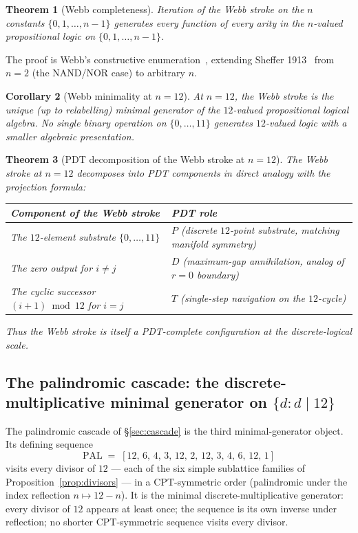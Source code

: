 \documentclass[11pt,a4paper]{article}
\newtheorem{theorem}{Theorem}[section]
\newtheorem{corollary}[theorem]{Corollary}
\theoremstyle{definition}
\theoremstyle{remark}
\begin{document}
\begin{theorem}[Webb completeness]\label{thm:webb-complete}
Iteration of the Webb stroke on the $n$ constants $\{0,1,\ldots,n-1\}$ generates every function of every arity in the $n$-valued propositional logic on $\{0,1,\ldots,n-1\}$.
\end{theorem}

The proof is Webb's constructive enumeration~\cite{Webb1935}, extending Sheffer 1913~\cite{Sheffer1913} from $n=2$ (the NAND/NOR case) to arbitrary $n$.

\begin{corollary}[Webb minimality at $n=12$]\label{cor:webb-minimal}
At $n=12$, the Webb stroke is the unique (up to relabelling) minimal generator of the $12$-valued propositional logical algebra. No single binary operation on $\{0,\ldots,11\}$ generates $12$-valued logic with a smaller algebraic presentation.
\end{corollary}

\begin{theorem}[PDT decomposition of the Webb stroke at $n=12$]\label{thm:webb-pdt}
The Webb stroke at $n=12$ decomposes into PDT components in direct analogy with the projection formula:
\begin{center}
\begin{tabularx}{\textwidth}{@{}XX@{}}
\toprule
Component of the Webb stroke & PDT role\\
\midrule
The $12$-element substrate $\{0,\ldots,11\}$ & $P$ (discrete $12$-point substrate, matching manifold symmetry)\\
The zero output for $i\ne j$ & $D$ (maximum-gap annihilation, analog of $r=0$ boundary)\\
The cyclic successor $(i+1)\bmod 12$ for $i=j$ & $T$ (single-step navigation on the $12$-cycle)\\
\bottomrule
\end{tabularx}
\end{center}
Thus the Webb stroke is itself a PDT-complete configuration at the discrete-logical scale.
\end{theorem}

\subsection{The palindromic cascade: the discrete-multiplicative minimal generator on $\{d:d\mid 12\}$}\label{subsec:palindromic}

The palindromic cascade of \S\ref{sec:cascade} is the third minimal-generator object. Its defining sequence
\[
\text{PAL} \;=\; [12,\,6,\,4,\,3,\,12,\,2,\,12,\,3,\,4,\,6,\,12,\,1]
\]
visits every divisor of $12$ --- each of the six simple sublattice families of Proposition~\ref{prop:divisors} --- in a CPT-symmetric order (palindromic under the index reflection $n\mapsto 12-n$). It is the minimal discrete-multiplicative generator: every divisor of $12$ appears at least once; the sequence is its own inverse under reflection; no shorter CPT-symmetric sequence visits every divisor.
\end{document}
